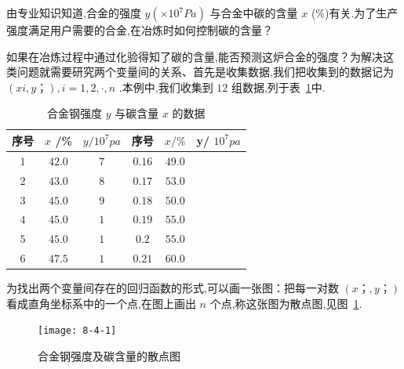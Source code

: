 \begin{example}
	由专业知识知道,合金的强度 $ y(\times 10^7Pa)  $ 与合金中碳的含量 $  x $ (\%)有关.为了生产强度满足用户需要的合金,在冶炼时如何控制碳的含量？
	
	如果在冶炼过程中通过化验得知了碳的含量,能否预测这炉合金的强度？为解决这类问题就需要研究两个变量间的关系、首先是收集数据,我们把收集到的数据记为 $ (xi,y；),i=1,2,\cdot ,n  $ .本例中,我们收集到 $ 12  $ 组数据,列于表~\ref{tab:8.4.1}中.
	
	\begin{table}[htbp]
		\centering
		\caption{合金钢强度 $ y  $ 与碳含量 $  x $ 的数据}
		\begin{tabular}{ccc||ccc}
			\toprule
			序号    &  $ x  $ /\%  &  $ y/10^7pa  $  & 序号    &  $ x/\%  $   & y/ $ 10^7pa  $  \\\midrule
			$ 1 $ & $ 42.0 $ & $ 7 $ & $ 0.16 $ & $ 49.0 $ \\
			$ 2 $ & $ 43.0 $ & $ 8 $ & $ 0.17 $ & $ 53.0 $ \\
			$ 3 $ & $ 45.0 $ & $ 9 $ & $ 0.18 $ & $ 50.0 $ \\
			$ 4 $ & $ 45.0 $ & $ 1 $ & $ 0.19 $ & $ 55.0 $ \\
			$ 5 $ & $ 45.0 $ & $ 1 $ & $ 0.2 $ & $ 55.0 $ \\
			$ 6 $ & $ 47.5 $ & $ 1 $ & $ 0.21 $ & $ 60.0 $ \\\bottomrule
		\end{tabular}%
		\label{tab:8.4.1}%
	\end{table}%
	
	为找出两个变量间存在的回归函数的形式,可以画一张图：把每一对数 $  (x；,y；) $ 看成直角坐标系中的一个点,在图上画出 $  n $ 个点,称这张图为散点图,见图~\ref{fig:8.4.1}.
	
	\begin{figure}[htbp]
		\centering
		\texttt{[image: 8-4-1]}
		\caption{合金钢强度及碳含量的散点图}
		\label{fig:8.4.1}
	\end{figure}
	

\end{example}
